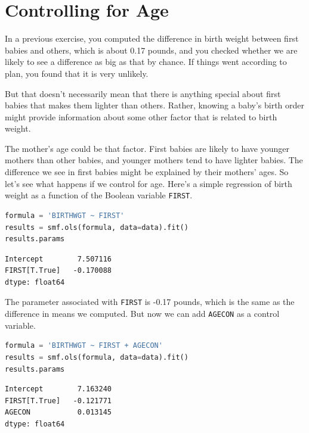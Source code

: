\section{Controlling for Age}\label{controlling-for-age}

In a previous exercise, you computed the difference in birth weight
between first babies and others, which is about 0.17 pounds, and you
checked whether we are likely to see a difference as big as that by
chance. If things went according to plan, you found that it is very
unlikely.

But that doesn't necessarily mean that there is anything special about
first babies that makes them lighter than others. Rather, knowing a
baby's birth order might provide information about some other factor
that is related to birth weight.

The mother's age could be that factor. First babies are likely to have
younger mothers than other babies, and younger mothers tend to have
lighter babies. The difference we see in first babies might be explained
by their mothers' ages. So let's see what happens if we control for age.
Here's a simple regression of birth weight as a function of the Boolean
variable \passthrough{\lstinline!FIRST!}.

\begin{lstlisting}[language=Python,style=source]
formula = 'BIRTHWGT ~ FIRST'
results = smf.ols(formula, data=data).fit()
results.params
\end{lstlisting}

\begin{lstlisting}[style=output]
Intercept        7.507116
FIRST[T.True]   -0.170088
dtype: float64
\end{lstlisting}

The parameter associated with \passthrough{\lstinline!FIRST!} is -0.17
pounds, which is the same as the difference in means we computed. But
now we can add \passthrough{\lstinline!AGECON!} as a control variable.

\begin{lstlisting}[language=Python,style=source]
formula = 'BIRTHWGT ~ FIRST + AGECON'
results = smf.ols(formula, data=data).fit()
results.params
\end{lstlisting}

\begin{lstlisting}[style=output]
Intercept        7.163240
FIRST[T.True]   -0.121771
AGECON           0.013145
dtype: float64
\end{lstlisting}

